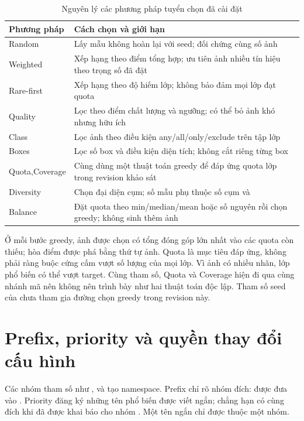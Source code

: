 \begin{table}[H]\centering\small
\caption{Nguyên lý các phương pháp tuyển chọn đã cài đặt}
\begin{tabularx}{\textwidth}{p{2.6cm}Y}
\toprule Phương pháp & Cách chọn và giới hạn \\\midrule
Random & Lấy mẫu không hoàn lại với seed; đối chứng cùng số ảnh \\
Weighted & Xếp hạng theo điểm tổng hợp; ưu tiên ảnh nhiều tín hiệu theo trọng số đã đặt \\
Rare-first & Xếp hạng theo độ hiếm lớp; không bảo đảm mọi lớp đạt quota \\
Quality & Lọc theo điểm chất lượng và ngưỡng; có thể bỏ ảnh khó nhưng hữu ích \\
Class & Lọc ảnh theo điều kiện any/all/only/exclude trên tập lớp \\
Boxes & Lọc số box và điều kiện diện tích; không cắt riêng từng box \\
Quota,\newline Coverage & Cùng dùng một thuật toán greedy để đáp ứng quota lớp trong revision khảo sát \\
Diversity & Chọn đại diện cụm; số mẫu phụ thuộc số cụm và  \\
Balance & Đặt quota theo min/median/mean hoặc số nguyên rồi chọn greedy; không sinh thêm ảnh \\
\bottomrule
\end{tabularx}
\end{table}
Ở mỗi bước greedy, ảnh được chọn có tổng đóng góp lớn nhất vào các quota còn thiếu; hòa điểm được phá bằng thứ tự ảnh. Quota là mục tiêu đáp ứng, không phải ràng buộc cứng cấm vượt số lượng của mọi lớp. Vì ảnh có nhiều nhãn, lớp phổ biến có thể vượt target. Cùng tham số, Quota và Coverage hiện đi qua cùng nhánh mã nên không nên trình bày như hai thuật toán độc lập. Tham số seed của  chưa tham gia đường chọn greedy trong revision này.

\section{Prefix, priority và quyền thay đổi cấu hình}
Các nhóm tham số như ,  và  tạo namespace. Prefix chỉ rõ nhóm đích:  được đưa vào . Priority đăng ký những tên phổ biến được viết ngắn; chẳng hạn  có cùng đích khi  đã được khai báo cho nhóm . Một tên ngắn chỉ được thuộc một nhóm.

